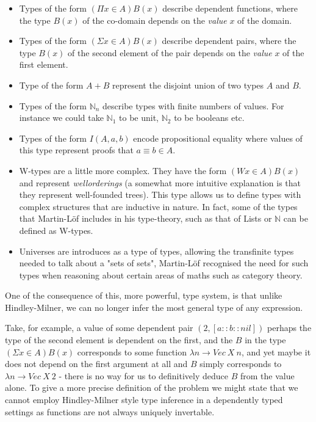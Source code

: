           \begin{itemize}
          \item Types of the form $( \Pi x \in A ) B(x)$ describe
            dependent functions, where the type $B(x)$ of the co-domain
            depends on the \emph{value} $x$ of the domain.
          \item Types of the form $( \Sigma x \in A ) B(x)$ describe
            dependent pairs, where the type $B(x)$ of the second
            element of the pair depends on the \emph{value} $x$ of the
            first element.
          \item Type of the form $A + B$ represent the disjoint union
            of two types $A$ and $B$.
          \item Types of the form $\mathbb{N}_n$ describe types
            with finite numbers of values. For instance we could take
            $\mathbb{N}_1$ to be unit, $\mathbb{N}_2$ to be booleans
            etc.
          \item Types of the form $I (A , a , b)$ encode propositional
            equality where values of this type represent proofs
            that $a \equiv b \in A$.
          \item W-types are a little more complex. They have the form
            $( W x \in A ) B(x)$ and represent \emph{wellorderings} (a
            somewhat more intuitive explanation is that they represent
            well-founded trees). This type allows us to define types
            with complex structures that are inductive in nature. In fact,
            some of the types that Martin-Löf includes in his
            type-theory, such as that of Lists or $\mathbb{N}$ can be
            defined as W-types.
          \item Universes are introduces as a type of types, allowing
            the transfinite types needed to talk about a "sets of
            sets", Martin-Löf recognised the need for such types when
            reasoning about certain areas of maths such as category
            theory.
          \end{itemize}

          One of the consequence of this, more powerful, type system,
          is that unlike Hindley-Milner, we can no longer infer the
          most general type of any expression.

          Take, for example, a value of some dependent pair $(2 , [a :: b
            :: nil])$ perhaps the type of the second element is
          dependent on the first, and the $B$ in the type $(
          \Sigma x \in A ) B(x)$ corresponds to some function $\lambda
          n \to Vec \: X \: n$, and yet maybe it does not depend on the first
          argument at all and $B$ simply corresponds to $\lambda n \to
          Vec \: X \: 2$ - there is no way for us to definitively
          deduce $B$ from the value alone. To give a more precise
          definition of the problem we might state that we cannot
          employ Hindley-Milner style type inference in a dependently
          typed settings as functions are not always uniquely invertable.

